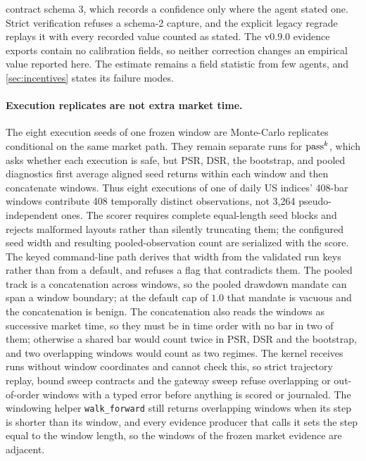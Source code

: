 contract schema 3, which records a confidence only where the agent stated one. Strict verification refuses a schema-2 capture, and the explicit legacy regrade replays it with every recorded value counted as stated. The v0.9.0 evidence exports contain no calibration fields, so neither correction changes an empirical value reported here. The estimate remains a field statistic from few agents, and \cref{sec:incentives} states its failure modes.

\paragraph{Execution replicates are not extra market time.} The eight execution seeds of one frozen window are Monte-Carlo replicates conditional on the same market path. They remain separate runs for $\text{pass}^{k}$, which asks whether each execution is safe, but PSR, DSR, the bootstrap, and pooled diagnostics first average aligned seed returns within each window and then concatenate windows. Thus eight executions of one of daily US indices' 408-bar windows contribute 408 temporally distinct observations, not 3,264 pseudo-independent ones. The scorer requires complete equal-length seed blocks and rejects malformed layouts rather than silently truncating them; the configured seed width and resulting pooled-observation count are serialized with the score. The keyed command-line path derives that width from the validated run keys rather than from a default, and refuses a flag that contradicts them. The pooled track is a concatenation across windows, so the pooled drawdown mandate can span a window boundary; at the default cap of $1.0$ that mandate is vacuous and the concatenation is benign. The concatenation also reads the windows as successive market time, so they must be in time order with no bar in two of them; otherwise a shared bar would count twice in PSR, DSR and the bootstrap, and two overlapping windows would count as two regimes. The kernel receives runs without window coordinates and cannot check this, so strict trajectory replay, bound sweep contracts and the gateway sweep refuse overlapping or out-of-order windows with a typed error before anything is scored or journaled. The windowing helper \texttt{walk\_forward} still returns overlapping windows when its step is shorter than its window, and every evidence producer that calls it sets the step equal to the window length, so the windows of the frozen market evidence are adjacent.

